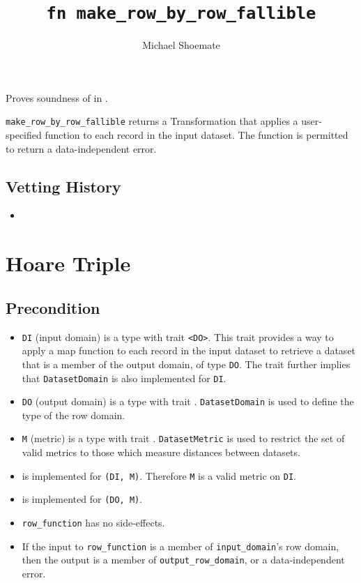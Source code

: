 \documentclass{article}
\title{\texttt{fn make\_row\_by\_row\_fallible}}
\author{Michael Shoemate}
\date{}
\begin{document}
\maketitle

\contrib
Proves soundness of  in .

\texttt{make\_row\_by\_row\_fallible} returns a Transformation that applies a user-specified function to each record in the input dataset.
The function is permitted to return a data-independent error.

\subsection*{Vetting History}
\begin{itemize}
    \item {}
\end{itemize}

\section{Hoare Triple}
\subsection*{Precondition}
\begin{itemize}

    \item \texttt{DI} (input domain) is a type with trait \texttt{<DO>}. 
        This trait provides a way to apply a map function to each record in the input dataset to retrieve a dataset that is a member of the output domain, of type \texttt{DO}. The trait further implies that \texttt{DatasetDomain} is also implemented for \texttt{DI}.
    \item \texttt{DO} (output domain) is a type with trait . 
        \texttt{DatasetDomain} is used to define the type of the row domain.
    \item \texttt{M} (metric) is a type with trait . 
        \texttt{DatasetMetric} is used to restrict the set of valid metrics to those which measure distances between datasets.
    \item {} is implemented for \texttt{(DI, M)}. Therefore \texttt{M} is a valid metric on \texttt{DI}.
    \item {} is implemented for \texttt{(DO, M)}.
    \item \texttt{row\_function} has no side-effects.
    \item If the input to \texttt{row\_function} is a member of \texttt{input\_domain}'s row domain, then the output is a member of \texttt{output\_row\_domain}, or a data-independent error.
\end{itemize}
\end{document}
